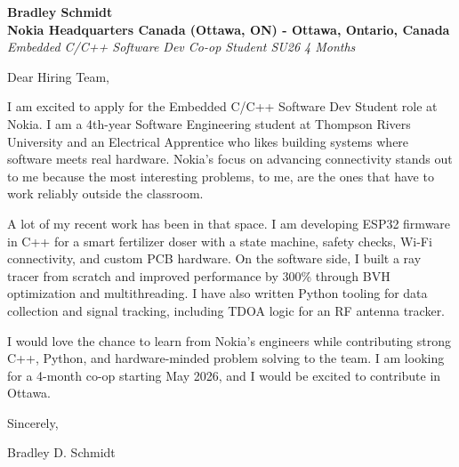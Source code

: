 \documentclass[11pt]{article}
\begin{document}
\textbf{Bradley Schmidt}\\
\vspace{0.5em}
\textbf{Nokia Headquarters Canada (Ottawa, ON) - Ottawa, Ontario, Canada}\\
\textit{Embedded C/C++ Software Dev Co-op Student SU26 4 Months}

Dear Hiring Team,

\par

I am excited to apply for the Embedded C/C++ Software Dev Student role at Nokia. I am a 4th-year Software Engineering student at Thompson Rivers University and an Electrical Apprentice who likes building systems where software meets real hardware. Nokia's focus on advancing connectivity stands out to me because the most interesting problems, to me, are the ones that have to work reliably outside the classroom.

\par

A lot of my recent work has been in that space. I am developing ESP32 firmware in C++ for a smart fertilizer doser with a state machine, safety checks, Wi-Fi connectivity, and custom PCB hardware. On the software side, I built a ray tracer from scratch and improved performance by 300\% through BVH optimization and multithreading. I have also written Python tooling for data collection and signal tracking, including TDOA logic for an RF antenna tracker.

\par

I would love the chance to learn from Nokia's engineers while contributing strong C++, Python, and hardware-minded problem solving to the team. I am looking for a 4-month co-op starting May 2026, and I would be excited to contribute in Ottawa.

\par

Sincerely,

\par

Bradley D. Schmidt
\end{document}

